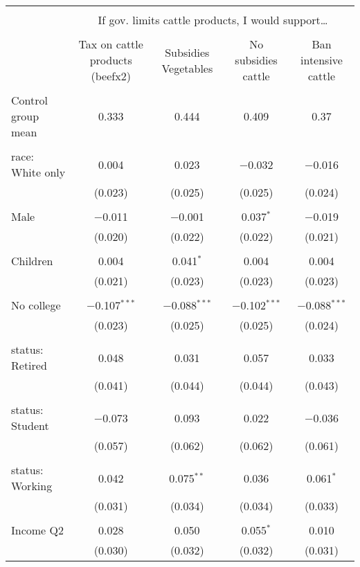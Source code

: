 
\begin{tabular}{@{\extracolsep{5pt}}lcccc} 
\\[-1.8ex]\hline 
\hline \\[-1.8ex] 
 & \multicolumn{4}{c}{If gov. limits cattle products, I would support…} \\ 
\cline{2-5} 
\\[-1.8ex] & Tax on cattle products (beefx2) & Subsidies Vegetables & No subsidies cattle & Ban intensive cattle \\ 
\hline \\[-1.8ex] 
 Control group mean & 0.333 & 0.444 & 0.409 & 0.37  \\ \hline \\[-1.8ex] race: White only & 0.004 & 0.023 & $-$0.032 & $-$0.016 \\ 
  & (0.023) & (0.025) & (0.025) & (0.024) \\ 
  & & & & \\ 
 Male & $-$0.011 & $-$0.001 & 0.037$^{*}$ & $-$0.019 \\ 
  & (0.020) & (0.022) & (0.022) & (0.021) \\ 
  & & & & \\ 
 Children & 0.004 & 0.041$^{*}$ & 0.004 & 0.004 \\ 
  & (0.021) & (0.023) & (0.023) & (0.023) \\ 
  & & & & \\ 
 No college & $-$0.107$^{***}$ & $-$0.088$^{***}$ & $-$0.102$^{***}$ & $-$0.088$^{***}$ \\ 
  & (0.023) & (0.025) & (0.025) & (0.024) \\ 
  & & & & \\ 
 status: Retired & 0.048 & 0.031 & 0.057 & 0.033 \\ 
  & (0.041) & (0.044) & (0.044) & (0.043) \\ 
  & & & & \\ 
 status: Student & $-$0.073 & 0.093 & 0.022 & $-$0.036 \\ 
  & (0.057) & (0.062) & (0.062) & (0.061) \\ 
  & & & & \\ 
 status: Working & 0.042 & 0.075$^{**}$ & 0.036 & 0.061$^{*}$ \\ 
  & (0.031) & (0.034) & (0.034) & (0.033) \\ 
  & & & & \\ 
 Income Q2 & 0.028 & 0.050 & 0.055$^{*}$ & 0.010 \\ 
  & (0.030) & (0.032) & (0.032) & (0.031) \\ 

\end{tabular}
